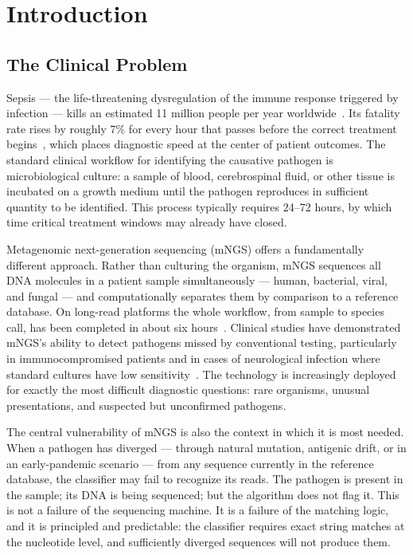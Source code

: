 \documentclass[12pt]{article}
\theoremstyle{definition}
\theoremstyle{plain}
\begin{document}
\section{Introduction}

\subsection{The Clinical Problem}

Sepsis --- the life-threatening dysregulation of the immune response
triggered by infection --- kills an estimated 11 million people per year
worldwide~\cite{who2024}. Its fatality rate rises by roughly 7\% for every
hour that passes before the correct treatment begins~\cite{kumar2006}, which
places diagnostic speed at the center of patient outcomes. The standard
clinical workflow for identifying the causative pathogen is microbiological
culture: a sample of blood, cerebrospinal fluid, or other tissue is
incubated on a growth medium until the pathogen reproduces in sufficient
quantity to be identified. This process typically requires 24--72 hours, by
which time critical treatment windows may already have closed.

Metagenomic next-generation sequencing (mNGS) offers a fundamentally
different approach. Rather than culturing the organism, mNGS sequences all
DNA molecules in a patient sample simultaneously --- human, bacterial,
viral, and fungal --- and computationally separates them by comparison to a
reference database. On long-read platforms the whole workflow, from sample
to species call, has been completed in about six
hours~\cite{charalampous2019}. Clinical studies have demonstrated mNGS's ability
to detect pathogens missed by conventional testing, particularly in
immunocompromised patients and in cases of neurological infection where
standard cultures have low sensitivity~\cite{wilson2019}. The technology is
increasingly deployed for exactly the most difficult diagnostic questions:
rare organisms, unusual presentations, and suspected but unconfirmed
pathogens.

The central vulnerability of mNGS is also the context in which it is most
needed. When a pathogen has diverged --- through natural mutation, antigenic
drift, or in an early-pandemic scenario --- from any sequence currently in
the reference database, the classifier may fail to recognize its reads. The
pathogen is present in the sample; its DNA is being sequenced; but the
algorithm does not flag it. This is not a failure of the sequencing machine.
It is a failure of the matching logic, and it is principled and predictable:
the classifier requires exact string matches at the nucleotide level, and
sufficiently diverged sequences will not produce them.
\end{document}
